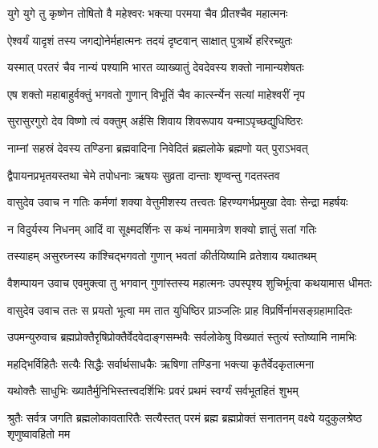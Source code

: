 \twolineshloka
{युगे युगे तु कृष्णेन तोषितो वै महेश्वरः}%
{भक्त्या परमया चैव प्रीतश्चैव महात्मनः}%

\twolineshloka
{ऐश्वर्यं यादृशं तस्य जगद्योनेर्महात्मनः}%
{तदयं दृष्टवान् साक्षात् पुत्रार्थे हरिरच्युतः}%

\twolineshloka
{यस्मात् परतरं चैव नान्यं पश्यामि भारत}%
{व्याख्यातुं देवदेवस्य शक्तो नामान्यशेषतः}%

\twolineshloka
{एष शक्तो महाबाहुर्वक्तुं भगवतो गुणान्}%
{विभूतिं चैव कार्त्स्न्येन सत्यां माहेश्वरीं नृप}%

\twolineshloka
{सुरासुरगुरो देव विष्णो त्वं वक्तुम् अर्हसि}%
{शिवाय शिवरूपाय यन्माऽपृच्छद्युधिष्ठिरः}%

\twolineshloka
{नाम्नां सहस्रं देवस्य तण्डिना ब्रह्मवादिना}%
{निवेदितं ब्रह्मलोके ब्रह्मणो यत् पुराऽभवत्}%

\twolineshloka
{द्वैपायनप्रभृतयस्तथा चेमे तपोधनाः}%
{ऋषयः सुव्रता दान्ताः शृण्वन्तु गदतस्तव}%


वासुदेव उवाच
\twolineshloka
{न गतिः कर्मणां शक्या वेत्तुमीशस्य तत्त्वतः}%
{हिरण्यगर्भप्रमुखा देवाः सेन्द्रा महर्षयः}%

\twolineshloka
{न विदुर्यस्य निधनम् आदिं वा सूक्ष्मदर्शिनः}%
{स कथं नाममात्रेण शक्यो ज्ञातुं सतां गतिः}%

\twolineshloka
{तस्याहम् असुरघ्नस्य कांश्चिद्भगवतो गुणान्}%
{भवतां कीर्तयिष्यामि व्रतेशाय यथातथम्}%

वैशम्पायन उवाच
\twolineshloka
{एवमुक्त्वा तु भगवान् गुणांस्तस्य महात्मनः}%
{उपस्पृश्य शुचिर्भूत्वा कथयामास धीमतः}%

वासुदेव उवाच\nopagebreak[4]
\twolineshloka
{ततः स प्रयतो भूत्वा मम तात युधिष्ठिर}%
{प्राञ्जलिः प्राह विप्रर्षिर्नामसङ्ग्रहामादितः}%


उपमन्युरुवाच\nopagebreak[4]
\twolineshloka
{ब्रह्मप्रोक्तैरृषिप्रोक्तैर्वेदवेदाङ्गसम्भवैः}%
{सर्वलोकेषु विख्यातं स्तुत्यं स्तोष्यामि नामभिः}%

\twolineshloka
{महद्भिर्विहितैः सत्यैः सिद्धैः सर्वार्थसाधकैः}%
{ऋषिणा तण्डिना भक्त्या कृतैर्वेदकृतात्मना}%

\twolineshloka
{यथोक्तैः साधुभिः ख्यातैर्मुनिभिस्तत्त्वदर्शिभिः}%
{प्रवरं प्रथमं स्वर्ग्यं सर्वभूतहितं शुभम्}%

\threelineshloka
{श्रुतैः सर्वत्र जगति ब्रह्मलोकावतारितैः}
{सत्यैस्तत् परमं ब्रह्म ब्रह्मप्रोक्तं सनातनम्}%
{वक्ष्ये यदुकुलश्रेष्ठ शृणुष्वावहितो मम}%

